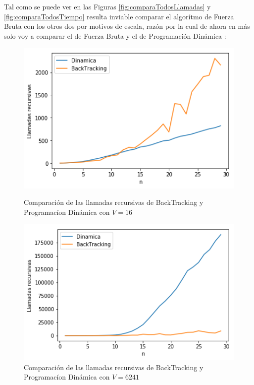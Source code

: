 Tal como se puede ver en las Figuras \ref{fig:comparaTodosLlamadas} y \ref{fig:comparaTodosTiempo} resulta
inviable comparar el algor\'itmo de Fuerza Bruta con los otros dos por motivos de escala, 
raz\'on por la cual de ahora en m\'as solo voy a comparar el de Fuerza Bruta y el de Programaci\'on Din\'amica :
\begin{figure}[H] 
    \centering
    \begin{minipage}{0.45\textwidth}
        \centering
        \includegraphics[width=1\textwidth]{img/llamadas/v/llamadasBackDinamicavChico.png} %
        \caption{Comparaci\'on de las llamadas recursivas de BackTracking y Programac\'ion Din\'amica con $V = 16$}
        \label{fig:llamadasBackDinamicavChico}
    \end{minipage}\hfill
    \begin{minipage}{0.45\textwidth}
        \centering
        \includegraphics[width=1\textwidth]{img/llamadas/v/llamadasBackDinamicavGrande.png} %
        \caption{Comparaci\'on de las llamadas recursivas de BackTracking y Programac\'ion Din\'amica con $V = 6241$}
        \label{fig:llamadasBackDinamicavGrande} 
    \end{minipage}
\end{figure}

